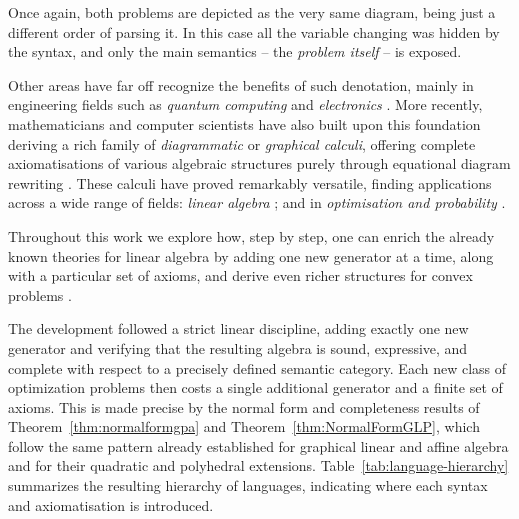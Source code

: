 Once again, both problems are depicted as the very same diagram, being just
a different order of parsing it. In this case all the variable changing was 
hidden by the syntax, and only the main semantics -- the \textit{problem itself} --
is exposed.

Other areas have far off recognize the benefits of such denotation, mainly in 
engineering fields such as \emph{quantum computing} \cite{coecke2011interacting} and
\emph{electronics} \cite{baez2018compositional}.
More recently, mathematicians and computer scientists have also 
built upon this foundation deriving a rich family of \emph{diagrammatic} 
or \emph{graphical calculi},
offering complete axiomatisations of various algebraic structures purely through
equational diagram rewriting \cite{selinger2010survey, bonchi2017interacting}.
These calculi have proved remarkably versatile, finding applications across a
wide range of fields:  \emph{linear algebra} \cite{bonchi2017interacting, bonchi2019affine, defreitas2025generalizinginvertiblematrixtheorem};
and in \emph{optimisation and probability} \cite{stein2024gqa, stein2025compositional, bonchi2021polyhedral}. 

Throughout this work we explore how, step by step,
one can enrich the already known theories for linear
\cite{bonchi2017interacting} algebra by adding one new generator at a time,
along with a particular
set of axioms, and derive even richer structures for convex problems \cite{stein2024compositional}.

The development followed a strict linear discipline, adding exactly one new
generator and verifying that the resulting algebra is
sound, expressive, and complete with respect to a precisely defined semantic
category. Each new class of optimization problems then costs a single
additional generator and a finite set of axioms.
This is made precise by the normal form and completeness results of
Theorem~\ref{thm:normalformgpa} and Theorem~\ref{thm:NormalFormGLP}, which follow the
same pattern already established for graphical linear and affine algebra
\cite{bonchi2017interacting, bonchi2019affine} and for their quadratic
\cite{stein2024gqa} and polyhedral \cite{bonchi2021polyhedral} extensions.
Table~\ref{tab:language-hierarchy} summarizes the resulting hierarchy of
languages, indicating where each syntax and axiomatisation is introduced.

